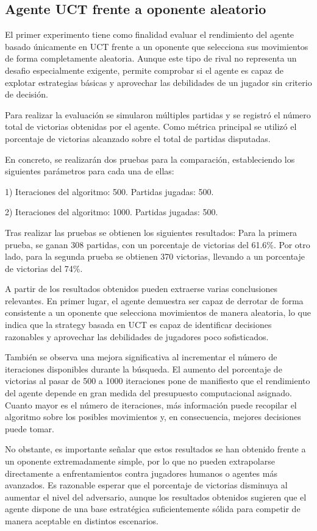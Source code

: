 \documentclass[conference,a4paper]{IEEEtran}
\begin{document}
\subsection{Agente UCT frente a oponente aleatorio} 
El primer experimento tiene como finalidad evaluar el rendimiento del agente basado únicamente en UCT frente a un oponente que selecciona sus movimientos de forma completamente aleatoria. Aunque este tipo de rival no representa un desafio especialmente exigente, permite comprobar si el agente es capaz de explotar estrategias básicas y aprovechar las debilidades de un jugador sin criterio de decisión. 

Para realizar la evaluación se simularon múltiples partidas y se registró el número total de victorias obtenidas por el agente. 
Como métrica principal se utilizó el porcentaje de victorias alcanzado sobre el total de partidas disputadas. 

En concreto, se realizarán dos pruebas para la comparación, estableciendo los siguientes parámetros para cada una de ellas: 

1) Iteraciones del algoritmo: 500. Partidas jugadas: 500. 

2) Iteraciones del algoritmo: 1000. Partidas jugadas: 500. 

Tras realizar las pruebas se obtienen los siguientes resultados: Para la primera prueba, se ganan 308 partidas, con un porcentaje de victorias del 61.6\%. 
Por otro lado, para la segunda prueba se obtienen 370 victorias, llevando a un porcentaje de victorias del 74\%. 

A partir de los resultados obtenidos pueden extraerse varias conclusiones relevantes. 
En primer lugar, el agente demuestra ser capaz de derrotar de forma consistente a un oponente que selecciona movimientos de manera aleatoria, lo que indica que la strategy basada en UCT es capaz de identificar decisiones razonables y aprovechar las debilidades de jugadores poco sofisticados. 

También se observa una mejora significativa al incrementar el número de iteraciones disponibles durante la búsqueda. 
El aumento del porcentaje de victorias al pasar de 500 a 1000 iteraciones pone de manifiesto que el rendimiento del agente depende en gran medida del presupuesto computacional asignado. 
Cuanto mayor es el número de iteraciones, más información puede recopilar el algoritmo sobre los posibles movimientos y, en consecuencia, mejores decisiones puede tomar. 

No obstante, es importante señalar que estos resultados se han obtenido frente a un oponente extremadamente simple, por lo que no pueden extrapolarse directamente a enfrentamientos contra jugadores humanos o agentes más avanzados. 
Es razonable esperar que el porcentaje de victorias disminuya al aumentar el nivel del adversario, aunque los resultados obtenidos sugieren que el agente dispone de una base estratégica suficientemente sólida para competir de manera aceptable en distintos escenarios. 
\end{document}
